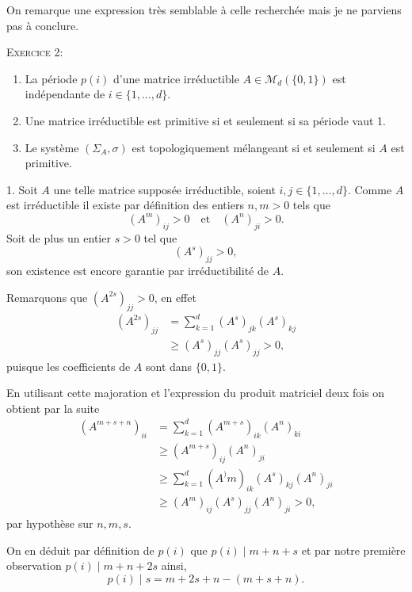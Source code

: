 \documentclass[12pt]{article}
\newenvironment{ex}[1]
{\begin{mdframed}[linewidth=0.6pt]
        \textsc{Exercice #1:}

}
    {\end{mdframed}}
\begin{document}
On remarque une expression très semblable à celle recherchée mais je ne parviens pas à conclure.

\newpage
        
\begin{ex}{2}
        \begin{enumerate}
                \item La période $p(i)$ d'une matrice irréductible $A \in \mathcal{M}_{d}(\{0,1\})$ est indépendante de $i \in \{1,\ldots,d\}$.
                \item Une matrice irréductible est primitive si et seulement si sa période vaut 1.
                \item Le système $(\Sigma_{A},\sigma)$ est topologiquement mélangeant si et seulement si $A$ est primitive.
        \end{enumerate}
\end{ex}

1. Soit $A$ une telle matrice supposée irréductible, soient $i,j \in \{1,\ldots,d\}$. Comme $A$ est irréductible il existe par définition des entiers $n, m > 0$ tels que  \[
        (A^{m})_{ij} > 0 \quad \text{et} \quad (A^{n})_{ji} > 0
.\] 
Soit de plus un entier $s > 0$ tel que \[
        (A^{s})_{jj} > 0
,\] son existence est encore garantie par irréductibilité de $A$. 

Remarquons que $(A^{2s})_{jj} > 0$, en effet
\begin{align*}
        (A^{2s})_{jj} &= \sum_{k=1}^{d} (A^{s})_{jk}(A^{s})_{kj} \\        
                      &\ge (A^{s})_{jj}(A^{s})_{jj} > 0
,\end{align*} puisque les coefficients de $A$ sont dans $\{0,1\}$.

En utilisant cette majoration et l'expression du produit matriciel deux fois on obtient par la suite
\begin{align*}
        (A^{m+s+n})_{ii} &= \sum_{k=1}^{d} (A^{m+s})_{ik}(A^{n})_{ki} \\
                         &\ge (A^{m+s})_{ij}(A^{n})_{ji} \\
                         &\ge \sum_{k=1}^{d} (A^){m})_{ik}(A^{s})_{kj}(A^{n})_{ji} \\
                         &\ge (A^{m})_{ij}(A^{s})_{jj}(A^{n})_{ji} > 0
,\end{align*} par hypothèse sur $n,m,s$.

On en déduit par définition de $p(i)$ que $p(i) \;|\; m+n+s$ et par notre première observation $p(i) \;|\; m+n+2s$ ainsi,  \[
        p(i) \;|\; s = m+2s+n - (m+s+n)
.\]  
\end{document}
